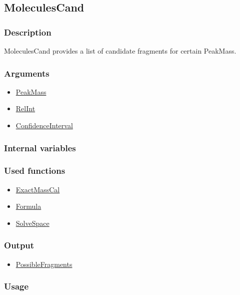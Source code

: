 \subsection{MoleculesCand}\label{MoleculesCand}
\subsubsection{Description}
MoleculesCand provides a list of candidate fragments for certain PeakMass.
\subsubsection{Arguments}
\begin{itemize}
\item \hyperref[PeakMass]{PeakMass}
\item \hyperref[RelInt]{RelInt}     
\item \hyperref[ConfidenceInterval]{ConfidenceInterval}
\end{itemize}
\subsubsection{Internal variables}
\subsubsection{Used functions}
\begin{itemize}
\item \hyperref[ExactMassCal]{ExactMassCal}
\item \hyperref[Formula]{Formula}
\item \hyperref[SolveSpace]{SolveSpace}
\end{itemize}
\subsubsection{Output}
\begin{itemize}
\item \hyperref[PossibleFragments]{PossibleFragments}
\end{itemize}
\subsubsection{Usage}

